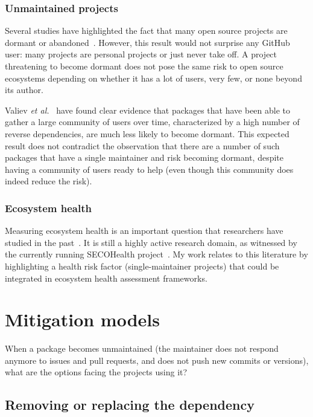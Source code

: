 \subsubsection{Unmaintained projects}

Several studies have highlighted the fact that many open source projects are dormant or abandoned~\cite{khondhu2013all,kalliamvakou2016depth}.
However, this result would not surprise any GitHub user: many projects are personal projects or just never take off.
A project threatening to become dormant does not pose the same risk to open source ecosystems depending on whether it has a lot of users, very few, or none beyond its author.

Valiev \emph{et al.}~\cite{valiev2018ecosystem} have found clear evidence that packages that have been able to gather a large community of users over time, characterized by a high number of reverse dependencies, are much less likely to become dormant.
This expected result does not contradict the observation that there are a number of such packages that have a single maintainer and risk becoming dormant, despite having a community of users ready to help (even though this community does indeed reduce the risk).

\subsubsection{Ecosystem health}

Measuring ecosystem health is an important question that researchers have studied in the past~\cite{jansen2014measuring}.
It is still a highly active research domain, as witnessed by the currently running SECOHealth project~\cite{mens2017towards}.
My work relates to this literature by highlighting a health risk factor (single-maintainer projects) that could be integrated in ecosystem health assessment frameworks.

\section{Mitigation models}

When a package becomes unmaintained (the maintainer does not respond
anymore to issues and pull requests, and does not push new commits or
versions), what are the options facing the projects using it?

\subsection{Removing or replacing the dependency}


